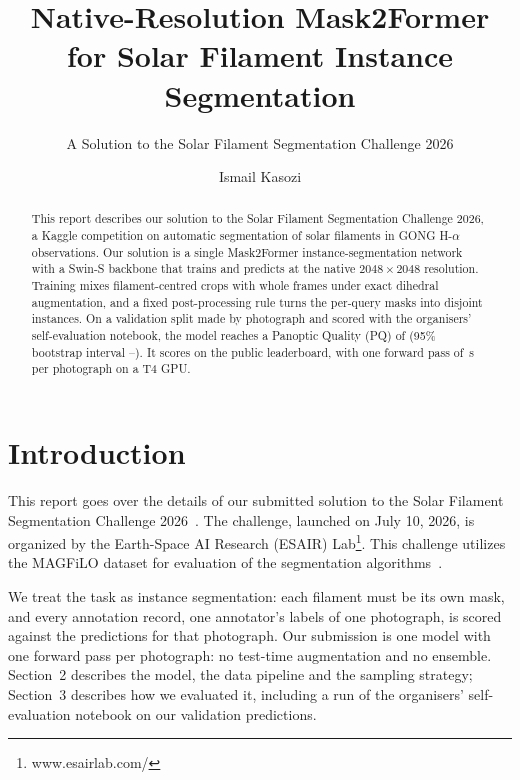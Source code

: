 \documentclass[sigconf]{acmart}
\begin{document}
\title{Native-Resolution Mask2Former for Solar Filament Instance Segmentation}
\subtitle{A Solution to the Solar Filament Segmentation Challenge 2026}

\author{Ismail Kasozi}

\begin{abstract}
This report describes our solution to the Solar Filament Segmentation Challenge 2026, a
Kaggle competition on automatic segmentation of solar filaments in GONG H-$\alpha$
observations. Our solution is a single Mask2Former instance-segmentation network with a
Swin-S backbone that trains and predicts at the native $2048\times2048$ resolution.
Training mixes filament-centred crops with whole frames under exact dihedral
augmentation, and a fixed post-processing rule turns the per-query masks into disjoint
instances. On a validation split made by photograph and scored with the organisers'
self-evaluation notebook, the model reaches a Panoptic Quality (PQ) of \HostPQ{}
(95\% bootstrap interval \PQLow{}--\PQHigh{}). It scores \BestPublic{} on the public
leaderboard, with one forward pass of \SecondsPerPhoto{}\,s per photograph on a T4 GPU.
\end{abstract}

\maketitle

\section{Introduction}
This report goes over the details of our submitted solution to the Solar Filament
Segmentation Challenge 2026~\cite{challenge}. The challenge, launched on July 10, 2026,
is organized by the Earth-Space AI Research (ESAIR) Lab\footnote{www.esairlab.com/}.
This challenge utilizes the MAGFiLO dataset for evaluation of the segmentation
algorithms~\cite{magfilo}.

We treat the task as instance segmentation: each filament must be its own mask, and
every annotation record, one annotator's labels of one photograph, is scored against
the predictions for that photograph. Our submission is one model with one forward pass
per photograph: no test-time augmentation and no ensemble. Section~2 describes the
model, the data pipeline and the sampling strategy; Section~3 describes how we
evaluated it, including a run of the organisers' self-evaluation notebook on our
validation predictions.
\end{document}
